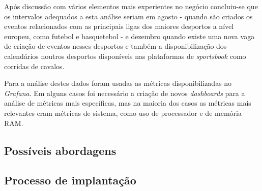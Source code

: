 Após discussão com vários elementos mais experientes no negócio concluiu-se que os intervalos
adequados a esta análise seriam em agosto - quando são criados os eventos relacionados com as
principais ligas dos maiores desportos a nível europeu, como futebol e basquetebol - e dezembro 
quando existe uma nova vaga de criação de eventos nesses desportos e também a disponibilização 
dos calendários noutros desportos disponíveis nas plataformas de \textit{sportsbook} como
corridas de cavalos.

Para a análise destes dados foram usadas as métricas disponibilizadas no \textit{Grafana}. Em alguns
casos foi necessário a criação de novos \textit{dashboards} para a análise de métricas mais 
específicas, mas na maioria dos casos as métricas mais relevantes eram métricas de sistema, como
uso de processador e de memória RAM.


\subsection{Possíveis abordagens}


\subsection{Processo de implantação}



